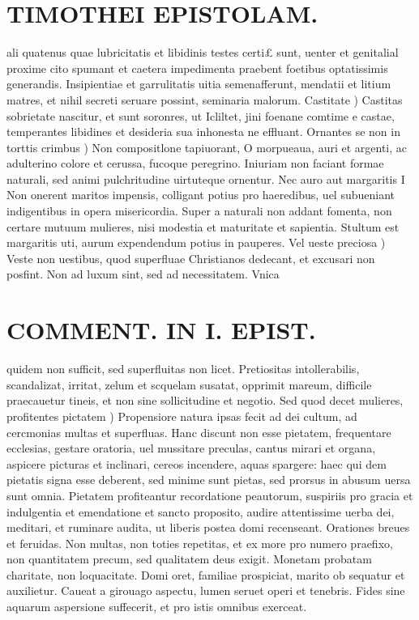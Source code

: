 \documentclass{article}
\begin{document}
\begin{pages}
\section*{TIMOTHEI EPISTOLAM. }
\marginpar{[ p.58 ]}\pstart ali quatenus quae lubricitatis et libidinis testes certi£ sunt, uenter et genitalial proxime cito spumant et caetera impedimenta praebent foetibus optatissimis generandis. Insipientiae et garrulitatis uitia semenafferunt, mendatii et litium matres, et nihil secreti seruare possint, seminaria malorum.  \pend\pstart Castitate ) Castitas sobrietate nascitur, et sunt soronres, ut Icliltet, jini foenane comtime e castae, temperantes libidines et desideria sua inhonesta ne effluant.  \pend\pstart Ornantes se non in torttis crimbus ) Non compositlone tapiuorant, O morpueaua, auri et argenti, ac adulterino colore et cerussa, fucoque peregrino. Iniuriam non faciant formae naturali, sed animi pulchritudine uirtuteque ornentur.  \pend\pstart Nec auro aut margaritis I Non onerent maritos impensis, colligant potius pro haeredibus, uel subueniant indigentibus in opera misericordia. Super a naturali non addant fomenta, non certare mutuum mulieres, nisi modestia et maturitate et sapientia. Stultum est margaritis uti, aurum expendendum potius in pauperes.  \pend\pstart Vel ueste preciosa ) Veste non uestibus, quod superfluae Christianos dedecant, et excusari non posfint. Non ad luxum sint, sed ad necessitatem. Vnica  \pend
\section*{COMMENT. IN I. EPIST. }
\marginpar{[ p.59 ]}\pstart quidem non sufficit, sed superfluitas non licet. Pretiositas intollerabilis, scandalizat, irritat, zelum et scquelam susatat, opprimit mareum, difficile praecauetur tineis, et non sine sollicitudine et negotio.  \pend\pstart Sed quod decet mulieres, profitentes pictatem )  Propensiore natura ipsas fecit ad dei cultum, ad cercmonias multas et superfluas. Hanc discunt non esse pietatem, frequentare ecclesias, gestare oratoria, uel mussitare preculas, cantus mirari et organa, aspicere picturas et inclinari, cereos incendere, aquas spargere: haec qui dem pietatis signa esse deberent, sed minime sunt pietas, sed prorsus in abusum uersa sunt omnia. Pietatem profiteantur recordatione peautorum, suspiriis pro gracia et indulgentia et emendatione et sancto proposito, audire attentissime uerba dei, meditari, et ruminare audita, ut liberis postea domi recenseant. Orationes breues et feruidas. Non multas, non toties repetitas, et ex more pro numero praefixo, non quantitatem precum, sed qualitatem deus exigit. Monetam probatam charitate, non loquacitate. Domi oret, familiae prospiciat, marito ob sequatur et auxilietur. Caueat a girouago aspectu, lumen seruet operi et tenebris. Fides sine aquarum aspersione suffecerit, et pro istis omnibus exerceat.  \pend

\end{pages}
\end{document}

